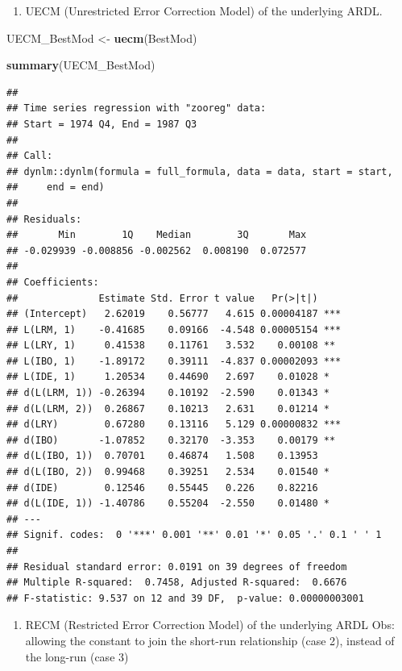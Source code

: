 \documentclass[
]{book}
\newenvironment{Shaded}{\begin{snugshade}}{\end{snugshade}}
\newcommand{\FunctionTok}[1]{\textcolor[rgb]{0.13,0.29,0.53}{\textbf{#1}}}
\newcommand{\NormalTok}[1]{#1}
\newcommand{\OtherTok}[1]{\textcolor[rgb]{0.56,0.35,0.01}{#1}}
\providecommand{\tightlist}{%
  \setlength{\itemsep}{0pt}\setlength{\parskip}{0pt}}
\begin{document}
\begin{enumerate}
\def\labelenumi{\arabic{enumi}.}
\setcounter{enumi}{1}
\tightlist
\item
  UECM (Unrestricted Error Correction Model) of the underlying ARDL.
\end{enumerate}

\begin{Shaded}
\begin{Highlighting}[]
\NormalTok{UECM\_BestMod }\OtherTok{\textless{}{-}} \FunctionTok{uecm}\NormalTok{(BestMod)}

\FunctionTok{summary}\NormalTok{(UECM\_BestMod)}
\end{Highlighting}
\end{Shaded}

\begin{verbatim}
## 
## Time series regression with "zooreg" data:
## Start = 1974 Q4, End = 1987 Q3
## 
## Call:
## dynlm::dynlm(formula = full_formula, data = data, start = start, 
##     end = end)
## 
## Residuals:
##       Min        1Q    Median        3Q       Max 
## -0.029939 -0.008856 -0.002562  0.008190  0.072577 
## 
## Coefficients:
##              Estimate Std. Error t value   Pr(>|t|)    
## (Intercept)   2.62019    0.56777   4.615 0.00004187 ***
## L(LRM, 1)    -0.41685    0.09166  -4.548 0.00005154 ***
## L(LRY, 1)     0.41538    0.11761   3.532    0.00108 ** 
## L(IBO, 1)    -1.89172    0.39111  -4.837 0.00002093 ***
## L(IDE, 1)     1.20534    0.44690   2.697    0.01028 *  
## d(L(LRM, 1)) -0.26394    0.10192  -2.590    0.01343 *  
## d(L(LRM, 2))  0.26867    0.10213   2.631    0.01214 *  
## d(LRY)        0.67280    0.13116   5.129 0.00000832 ***
## d(IBO)       -1.07852    0.32170  -3.353    0.00179 ** 
## d(L(IBO, 1))  0.70701    0.46874   1.508    0.13953    
## d(L(IBO, 2))  0.99468    0.39251   2.534    0.01540 *  
## d(IDE)        0.12546    0.55445   0.226    0.82216    
## d(L(IDE, 1)) -1.40786    0.55204  -2.550    0.01480 *  
## ---
## Signif. codes:  0 '***' 0.001 '**' 0.01 '*' 0.05 '.' 0.1 ' ' 1
## 
## Residual standard error: 0.0191 on 39 degrees of freedom
## Multiple R-squared:  0.7458, Adjusted R-squared:  0.6676 
## F-statistic: 9.537 on 12 and 39 DF,  p-value: 0.00000003001
\end{verbatim}

\begin{enumerate}
\def\labelenumi{\arabic{enumi}.}
\setcounter{enumi}{2}
\tightlist
\item
  RECM (Restricted Error Correction Model) of the underlying ARDL
  Obs: allowing the constant to join the short-run relationship (case 2), instead of the long-run (case 3)
\end{enumerate}
\end{document}
